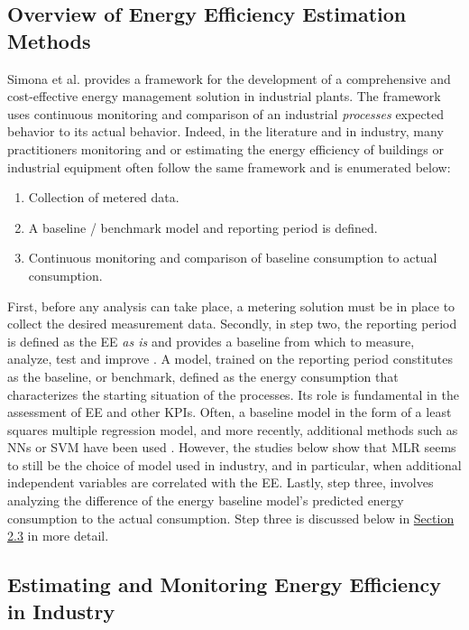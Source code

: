 \subsection{Overview of Energy Efficiency Estimation Methods}

Simona et al. \cite{kini_methodology_2011} provides a framework for the development of a comprehensive and cost-effective energy management solution in industrial plants. The framework uses continuous monitoring and comparison of an industrial \textit{processes} expected behavior to its actual behavior. Indeed, in the literature and in industry, many practitioners monitoring and or estimating the energy efficiency of buildings or industrial equipment often follow the same framework and is enumerated below: 

\begin{enumerate}
    \item Collection of metered data.
    \item A baseline / benchmark model and reporting period is defined.
    \item Continuous monitoring and comparison of baseline consumption to actual consumption.
\end{enumerate}

First, before any analysis can take place, a metering solution must be in place to collect the desired measurement data. Secondly, in step two, the reporting period is defined as the EE \textit{as is} and provides a baseline from which to measure, analyze, test and improve \cite{oakland_statistical_2008}. A model, trained on the reporting period constitutes as the baseline, or benchmark, defined as the energy consumption that characterizes the starting situation of the processes. Its role is fundamental in the assessment of EE and other \ac{KPIs}. Often, a baseline model in the form of a least squares multiple regression model, and more recently, additional methods such as \ac{NNs} or \ac{SVM} have been used \cite{cas}. However, the studies below show that  \ac{MLR} seems to still be the choice of model used in industry, and in particular, when additional independent variables are correlated with the EE. Lastly, step three, involves analyzing the difference of the energy baseline model's predicted energy consumption to the actual consumption. Step three is discussed below in \hyperlink{subsection.2.3}{Section 2.3} in more detail.

\subsection{Estimating and Monitoring Energy Efficiency in Industry}

